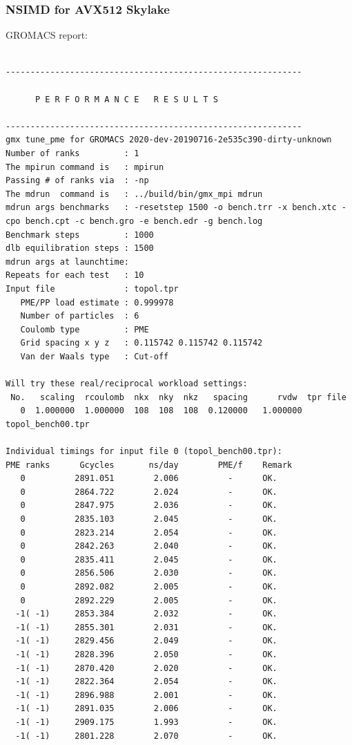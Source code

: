 \subsubsection{NSIMD for AVX512 Skylake}
GROMACS report: \\
\begin{lstlisting}[frame=single]

------------------------------------------------------------

      P E R F O R M A N C E   R E S U L T S

------------------------------------------------------------
gmx tune_pme for GROMACS 2020-dev-20190716-2e535c390-dirty-unknown
Number of ranks         : 1
The mpirun command is   : mpirun
Passing # of ranks via  : -np
The mdrun  command is   : ../build/bin/gmx_mpi mdrun
mdrun args benchmarks   : -resetstep 1500 -o bench.trr -x bench.xtc -cpo bench.cpt -c bench.gro -e bench.edr -g bench.log 
Benchmark steps         : 1000
dlb equilibration steps : 1500
mdrun args at launchtime: 
Repeats for each test   : 10
Input file              : topol.tpr
   PME/PP load estimate : 0.999978
   Number of particles  : 6
   Coulomb type         : PME
   Grid spacing x y z   : 0.115742 0.115742 0.115742
   Van der Waals type   : Cut-off

Will try these real/reciprocal workload settings:
 No.   scaling  rcoulomb  nkx  nky  nkz   spacing      rvdw  tpr file
   0  1.000000  1.000000  108  108  108  0.120000   1.000000  topol_bench00.tpr

Individual timings for input file 0 (topol_bench00.tpr):
PME ranks      Gcycles       ns/day        PME/f    Remark
   0          2891.051        2.006          -      OK.
   0          2864.722        2.024          -      OK.
   0          2847.975        2.036          -      OK.
   0          2835.103        2.045          -      OK.
   0          2823.214        2.054          -      OK.
   0          2842.263        2.040          -      OK.
   0          2835.411        2.045          -      OK.
   0          2856.506        2.030          -      OK.
   0          2892.082        2.005          -      OK.
   0          2892.229        2.005          -      OK.
  -1( -1)     2853.384        2.032          -      OK.
  -1( -1)     2855.301        2.031          -      OK.
  -1( -1)     2829.456        2.049          -      OK.
  -1( -1)     2828.396        2.050          -      OK.
  -1( -1)     2870.420        2.020          -      OK.
  -1( -1)     2822.364        2.054          -      OK.
  -1( -1)     2896.988        2.001          -      OK.
  -1( -1)     2891.035        2.006          -      OK.
  -1( -1)     2909.175        1.993          -      OK.
  -1( -1)     2801.228        2.070          -      OK.


\end{lstlisting}
